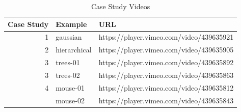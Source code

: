 \documentclass[article,notitle]{jdssv}
\begin{document}
\begin{table}[H]

\caption{\label{tab:vimeo}Case Study Videos}
\centering
\begin{tabular}[t]{rll}
\toprule
Case Study & Example & URL\\
\midrule
1 & gaussian & https://player.vimeo.com/video/439635921\\
2 & hierarchical & https://player.vimeo.com/video/439635905\\
3 & trees-01 & https://player.vimeo.com/video/439635892\\
3 & trees-02 & https://player.vimeo.com/video/439635863\\
4 & mouse-01 & https://player.vimeo.com/video/439635812\\
\addlinespace
4 & mouse-02 & https://player.vimeo.com/video/439635843\\
\bottomrule
\end{tabular}
\end{table}

\renewcommand\refname{References}

\end{document}
